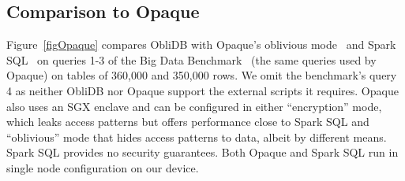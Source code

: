 \documentclass[letterpaper,twocolumn,10pt]{article}
\def\name/{ObliDB}
\begin{document}
\subsection{Comparison to Opaque}

Figure~\ref{figOpaque} compares \name/ with Opaque's oblivious mode~\cite{ZDB+17} and Spark SQL~\cite{SparkSQL} on queries 1-3 of the Big Data Benchmark~\cite{BDB} (the same queries used by Opaque) on tables of 360,000 and 350,000 rows. We omit the benchmark's query 4 as neither \name/ nor Opaque support the external scripts it requires. Opaque also uses an SGX enclave and can be configured in either ``encryption'' mode, which leaks access patterns but offers performance close to Spark SQL and ``oblivious'' mode that hides access patterns to data, albeit by different means. Spark SQL provides no security guarantees. Both Opaque and Spark SQL run in single node configuration on our device.
\end{document}
